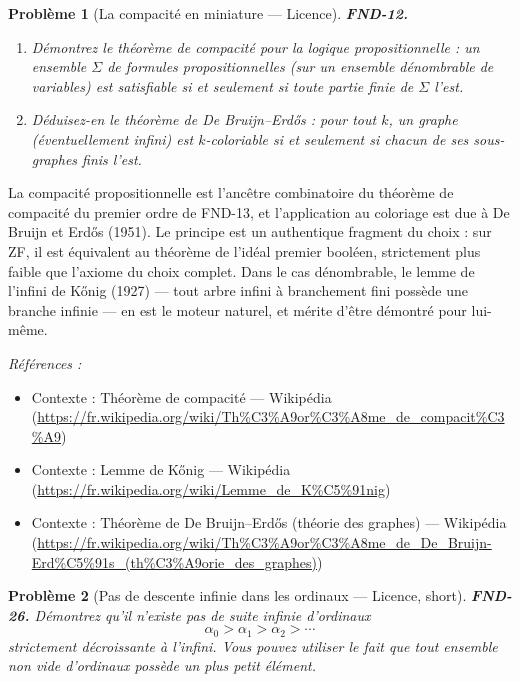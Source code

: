 \documentclass[11pt]{article}
\newtheorem{problem}{Problème}
\newenvironment{refs}{\par\small\noindent\emph{Références :}\begin{itemize}\setlength\itemsep{0pt}}{\end{itemize}\normalsize}
\begin{document}
\bigskip

\begin{problem}[{La compacité en miniature --- Licence}]
\textbf{FND-12.} \begin{enumerate}
\item[(a)] Démontrez le théorème de compacité pour la logique
propositionnelle : un ensemble $ \Sigma $ de formules propositionnelles (sur un ensemble
dénombrable de variables) est satisfiable si et seulement si toute partie finie de $ \Sigma $
l'est.
\item[(b)] Déduisez-en le
théorème de De Bruijn--Erd\H{o}s : pour tout $ k $, un graphe (éventuellement infini) est
$ k $-coloriable si et seulement si chacun de ses sous-graphes finis l'est.
\end{enumerate}

\end{problem}

\noindent La compacité propositionnelle est l'ancêtre combinatoire du théorème de
compacité du premier ordre de FND-13, et l'application au coloriage est due à De Bruijn et Erd\H{o}s
(1951). Le principe est un authentique fragment du choix : sur ZF, il est équivalent au théorème
de l'idéal premier booléen, strictement plus faible que l'axiome du choix complet. Dans le cas
dénombrable, le lemme de l'infini de K\H{o}nig (1927) --- tout arbre infini à branchement fini possède
une branche infinie --- en est le moteur naturel, et mérite d'être démontré pour lui-même.

\begin{refs}
\item Contexte : Théorème de compacité --- Wikipédia (\url{https://fr.wikipedia.org/wiki/Th%C3%A9or%C3%A8me_de_compacit%C3%A9})
\item Contexte : Lemme de K\H{o}nig --- Wikipédia (\url{https://fr.wikipedia.org/wiki/Lemme_de_K%C5%91nig})
\item Contexte : Théorème de De Bruijn--Erd\H{o}s (théorie des graphes) --- Wikipédia (\url{https://fr.wikipedia.org/wiki/Th%C3%A9or%C3%A8me_de_De_Bruijn-Erd%C5%91s_(th%C3%A9orie_des_graphes)})
\end{refs}

\bigskip

\begin{problem}[{Pas de descente infinie dans les ordinaux --- Licence, short}]
\textbf{FND-26.} Démontrez qu'il n'existe pas de suite infinie d'ordinaux
\[ \alpha_0 > \alpha_1 > \alpha_2 > \cdots \]
strictement décroissante à l'infini. Vous pouvez utiliser le fait que tout ensemble non vide
d'ordinaux possède un plus petit élément.
\end{problem}
\end{document}
